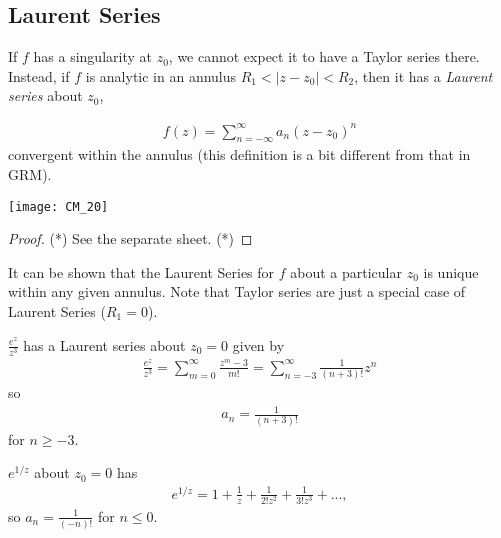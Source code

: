\documentclass[a4paper]{article}
\begin{document}
\subsection{Laurent Series}
If $f$ has a singularity at $z_0$, we cannot expect it to have a Taylor series there. Instead, if $f$ is analytic in an annulus $R_1<|z-z_0|<R_2$, then it has a \emph{Laurent series} about $z_0$,

\begin{equation*}
\begin{aligned}
f(z) = \sum_{n=-\infty}^\infty a_n (z-z_0)^n
\end{aligned}
\end{equation*}
convergent within the annulus (this definition is a bit different from that in GRM).

\texttt{[image: CM\_20]}

\begin{proof}(*)
See the separate sheet. (*)
\end{proof}

It can be shown that the Laurent Series for $f$ about a particular $z_0$ is unique within any given annulus. Note that Taylor series are just a special case of Laurent Series ($R_1=0$).

\begin{eg}
$\frac{e^z}{z^3}$ has a Laurent series about $z_0=0$ given by
\begin{equation*}
\begin{aligned}
\frac{e^z}{z^3} = \sum_{m=0}^\infty \frac{z^m-3}{m!} = \sum_{n=-3}^\infty \frac{1}{(n+3)!} z^n
\end{aligned}
\end{equation*}
so
\begin{equation*}
\begin{aligned}
a_n = \frac{1}{(n+3)!}
\end{aligned}
\end{equation*}
for $n \geq -3$.
\end{eg}

\begin{eg}
$e^{1/z}$ about $z_0=0$ has
\begin{equation*}
\begin{aligned}
e^{1/z} = 1+\frac{1}{z}+\frac{1}{2!z^2}+\frac{1}{3!z^3}+...,
\end{aligned}
\end{equation*}
so $a_n = \frac{1}{(-n)!}$ for $n\leq 0$.
\end{eg}
\end{document}
